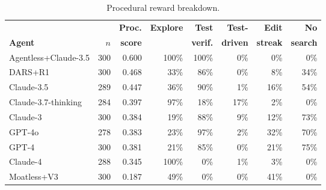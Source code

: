 \documentclass[11pt]{article}
\begin{document}
  \begin{table}[H]
  \centering\small\setlength{\tabcolsep}{5pt}
  \begin{tabular}{lrrrrrrr}
  \toprule
                      &     & \textbf{Proc.} & \textbf{Explore} & \textbf{Test} & \textbf{Test-} & \textbf{Edit} & \textbf{No} \\
  \textbf{Agent}      & \textbf{$n$} & \textbf{score} &        & \textbf{verif.} & \textbf{driven} & \textbf{streak} & \textbf{search} \\
  \midrule
  \rowcolor{owbg}     Agentless+Claude-3.5 & 300 & 0.600 & 100\% & 100\% & 0\%  & 0\%  & 0\%  \\
  \rowcolor{owbg}     DARS+R1              & 300 & 0.468 & 33\%  & 86\%  & 0\%  & 8\%  & 34\% \\
  \rowcolor{claudebg} Claude-3.5           & 289 & 0.447 & 36\%  & 90\%  & 1\%  & 16\% & 54\% \\
  \rowcolor{claudebg} Claude-3.7-thinking  & 284 & 0.397 & 97\%  & 18\%  & 17\% & 2\%  & 0\%  \\
  \rowcolor{claudebg} Claude-3             & 300 & 0.384 & 19\%  & 88\%  & 9\%  & 12\% & 73\% \\
  \rowcolor{gptbg}    GPT-4o               & 278 & 0.383 & 23\%  & 97\%  & 2\%  & 32\% & 70\% \\
  \rowcolor{gptbg}    GPT-4                & 300 & 0.381 & 21\%  & 85\%  & 0\%  & 21\% & 75\% \\
  \rowcolor{claudebg} Claude-4             & 288 & 0.345 & 100\% & 0\%   & 1\%  & 3\%  & 0\%  \\
  \rowcolor{owbg}     Moatless+V3          & 300 & 0.187 & 49\%  & 0\%   & 0\%  & 41\% & 0\%  \\
  \bottomrule
  \end{tabular}
  \caption{Procedural reward breakdown.}
  \label{tab:reward_results}
  \end{table}


\end{document}
